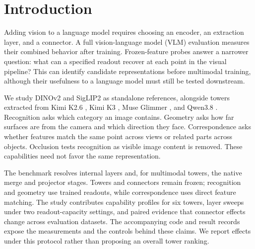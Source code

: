 \section{Introduction}
Adding vision to a language model requires choosing an encoder, an extraction layer,
and a connector. A full vision-language model (VLM) evaluation measures their combined
behavior after training. Frozen-feature probes answer a narrower question: what can a
specified readout recover at each point in the visual pipeline? This can identify
candidate representations before multimodal training, although their usefulness to a
language model must still be tested downstream.

We study DINOv2 \citep{oquab2024dinov2} and SigLIP2 \citep{tschannen2025siglip2} as
standalone references, alongside towers extracted from Kimi K2.6 \citep{moonshot2026kimik26},
Kimi K3 \citep{moonshot2026kimik3}, Muse Glimmer \citep{meta2026museglimmer}, and
Qwen3.8 \citep{qwen2026qwen38}. Recognition asks which category an image
contains. Geometry asks how far surfaces are from the camera and which direction they
face. Correspondence asks whether features match the same point across views or related
parts across objects. Occlusion tests recognition as visible image content is removed.
These capabilities need not favor the same representation.

The benchmark resolves internal layers and, for multimodal towers, the native merge and
projector stages. Towers and connectors remain frozen; recognition and geometry use
trained readouts, while correspondence uses direct feature matching. The study contributes
capability profiles for six towers, layer sweeps under two readout-capacity settings, and
paired evidence that connector effects change across evaluation datasets. The accompanying
code and result records expose the measurements and the controls behind these claims.
We report effects under this protocol rather than proposing an overall tower ranking.
